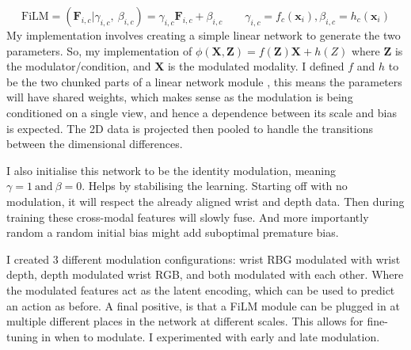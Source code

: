 \[
\text{FiLM} = \left( \mathbf{F}_{i, c} | \gamma_{i, c}, ~\beta_{i, c} \right) = \gamma_{i, c}\mathbf{F}_{i, c} + \beta_{i, c} \qquad  \gamma_{i, c} = f_c\left(\mathbf{x}_i \right), \beta_{i, c} = h_c \left( \mathbf {x}_i \right)
\]
My implementation involves creating a simple linear network to generate the two parameters. So, my implementation of \(\phi\left(\mathbf{X}, \mathbf{Z}\right) = f\left(\mathbf{Z}\right)\mathbf{X} + h\left(Z\right)\) where $\mathbf{Z}$ is the modulator/condition, and $\mathbf{X}$ is the modulated modality. I defined $f$ and $h$ to be the two chunked parts of a linear network module \cite{pytorch}, this means the parameters will have shared weights, which makes sense as the modulation is being conditioned on a single view, and hence a dependence between its scale and bias is expected. The 2D data is projected then pooled to handle the transitions between the dimensional differences.

I also initialise this network to be the identity modulation, meaning \(\gamma = 1 ~\text{and} ~\beta = 0\). Helps by stabilising the learning. Starting off with no modulation, it will respect the already aligned wrist and depth data. Then during training these cross-modal features will slowly fuse. And more importantly random a random initial bias might add suboptimal premature bias. 

I created 3 different modulation configurations: wrist RBG modulated with wrist depth, depth modulated wrist RGB, and both modulated with each other. Where the modulated features act as the latent encoding, which can be used to predict an action as before. A final positive, is that a FiLM module can be plugged in at multiple different places in the network at different scales. This allows for fine-tuning in when to modulate. I experimented with early and late modulation.



